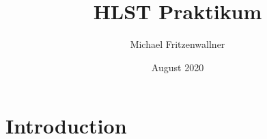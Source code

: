 \documentclass{article}
\title{HLST Praktikum}
\author{Michael Fritzenwallner}
\date{August 2020}
\begin{document}
\maketitle

\section{Introduction}
\end{document}

